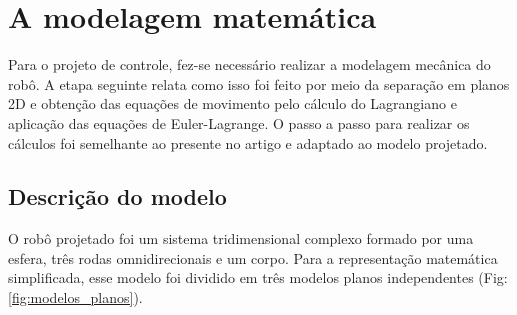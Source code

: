 \section{A modelagem matemática}
\label{sec:modelagemmatematica}

Para o projeto de controle, fez-se necessário realizar a modelagem mecânica do robô. A etapa seguinte relata como isso foi feito por meio da separação em planos 2D e obtenção das equações de movimento pelo cálculo do Lagrangiano e aplicação das equações de Euler-Lagrange. O passo a passo para realizar os cálculos foi semelhante ao presente no artigo \cite{phdthesis} e adaptado ao modelo projetado.

\subsection{Descrição do modelo}

O robô projetado foi um sistema tridimensional complexo formado por uma esfera, três rodas omnidirecionais e um corpo. Para a representação matemática simplificada, esse modelo foi dividido em três modelos planos independentes (Fig: \ref{fig:modelos_planos}).

